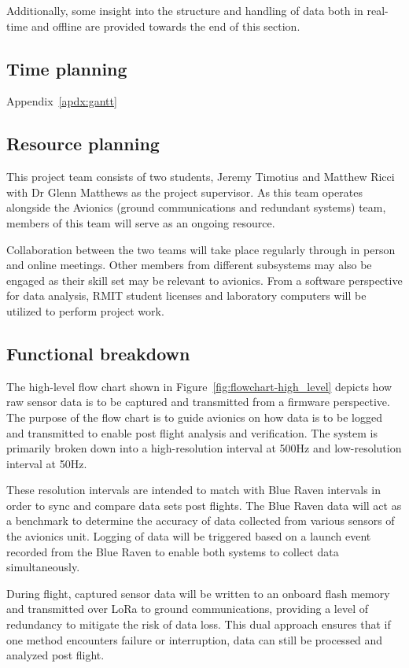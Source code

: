 Additionally, some insight into the structure and handling of data both in real-time and offline are provided towards the end of this section.

\subsection{Time planning}
Appendix~\ref{apdx:gantt}

\subsection{Resource planning}
This project team consists of two students, Jeremy Timotius and Matthew Ricci with Dr Glenn Matthews as the project supervisor. As this team operates alongside the Avionics (ground communications and redundant systems) team, members of this team will serve as an ongoing resource. 

Collaboration between the two teams will take place regularly through in person and online meetings. Other members from different subsystems may also be engaged as their skill set may be relevant to avionics. From a software perspective for data analysis, RMIT student licenses and laboratory computers will be utilized to perform project work.  

\subsection{Functional breakdown}
The high-level flow chart shown in Figure~\ref{fig:flowchart-high_level} depicts how raw sensor data is to be captured and transmitted from a firmware perspective. The purpose of the flow chart is to guide avionics on how data is to be logged and transmitted to enable post flight analysis and verification. The system is primarily broken down into a high-resolution interval at 500Hz and low-resolution interval at 50Hz. 

These resolution intervals are intended to match with Blue Raven intervals in order to sync and compare data sets post flights. The Blue Raven data will act as a benchmark to determine the accuracy of data collected from various sensors of the avionics unit. Logging of data will be triggered based on a launch event recorded from the Blue Raven to enable both systems to collect data simultaneously. 

During flight, captured sensor data will be written to an onboard flash memory and transmitted over LoRa to ground communications, providing a level of redundancy to mitigate the risk of data loss. This dual approach ensures that if one method encounters failure or interruption, data can still be processed and analyzed post flight. 

